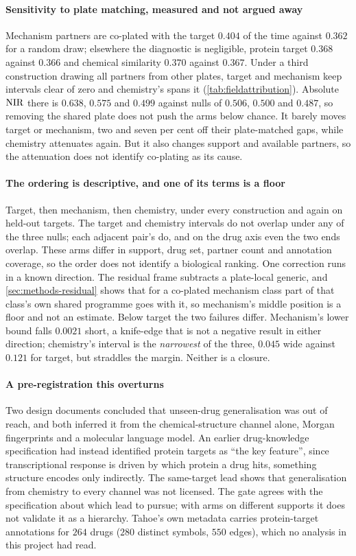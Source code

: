 \paragraph{Sensitivity to plate matching, measured and not argued away} Mechanism
partners are co-plated with the target $0.404$ of the time against $0.362$ for a
random draw; elsewhere the diagnostic is negligible, protein target $0.368$
against $0.366$ and chemical similarity $0.370$ against $0.367$. Under a third
construction drawing all partners from other plates, target and mechanism keep
intervals clear of zero and chemistry's spans it
(\cref{tab:fieldattribution}). Absolute $\textrm{NIR}$ there is $0.638$, $0.575$ and
$0.499$ against nulls of $0.506$, $0.500$ and $0.487$, so removing the shared
plate does not push the arms below chance. It barely moves target or mechanism,
two and seven per cent off their plate-matched gaps, while chemistry attenuates
again. But it also changes support and available partners, so the attenuation
does not identify co-plating as its cause.

\paragraph{The ordering is descriptive, and one of its terms is a floor} Target,
then mechanism, then chemistry, under every construction and again on held-out
targets. The target and chemistry intervals do not overlap under any of the three
nulls; each adjacent pair's do, and on the drug axis even the two ends overlap.
These arms differ in support, drug set, partner count and annotation coverage, so
the order does not identify a biological ranking. One correction runs in a known
direction. The residual frame subtracts a plate-local generic, and
\cref{sec:methods-residual} shows that for a co-plated mechanism class part of
that class's own shared programme goes with it, so mechanism's middle position is
a floor and not an estimate. Below target the two failures differ. Mechanism's
lower bound falls $0.0021$ short, a knife-edge that is not a negative result in
either direction; chemistry's interval is the \emph{narrowest} of the three,
$0.045$ wide against $0.121$ for target, but straddles the margin. Neither is a
closure.

\paragraph{A pre-registration this overturns} Two design documents concluded that
unseen-drug generalisation was out of reach, and both inferred it from the
chemical-structure channel alone, Morgan fingerprints and a molecular language
model. An earlier drug-knowledge specification had instead identified protein
targets as ``the key feature'', since transcriptional response is driven by which
protein a drug hits, something structure encodes only indirectly. The
same-target lead shows that generalisation from chemistry to every channel was
not licensed. The gate agrees with the specification about which lead to pursue;
with arms on different supports it does not validate it as a hierarchy. Tahoe's
own metadata carries protein-target annotations for $264$ drugs ($280$ distinct
symbols, $550$ edges), which no analysis in this project had read.

